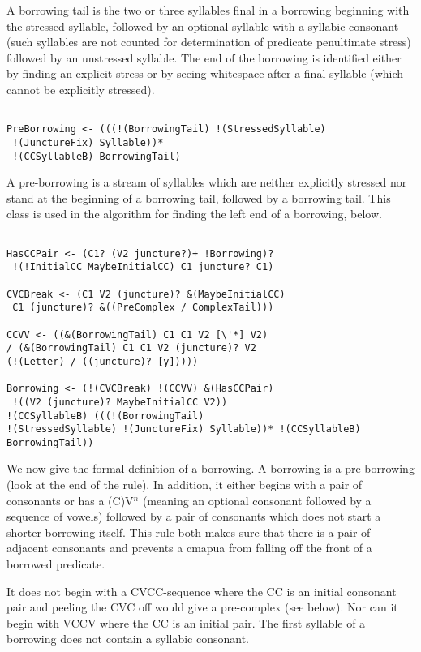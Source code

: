 \documentclass[12pt]{article}
\begin{document}
A borrowing tail is the two or three syllables final in a borrowing beginning with the stressed syllable, followed by
an optional syllable with a syllabic consonant (such syllables are not counted for determination of predicate penultimate stress) followed by an unstressed syllable.  The end of the borrowing is identified either by finding an explicit stress
or by seeing whitespace after a final syllable (which cannot be explicitly stressed).

\begin{verbatim}

PreBorrowing <- (((!(BorrowingTail) !(StressedSyllable)
 !(JunctureFix) Syllable))*
 !(CCSyllableB) BorrowingTail)

\end{verbatim}

A pre-borrowing is a stream of syllables which are neither explicitly stressed nor stand at the beginning of a borrowing tail,
followed by a borrowing tail.  This class is used in the algorithm for finding the left end of a borrowing, below.

\begin{verbatim}

HasCCPair <- (C1? (V2 juncture?)+ !Borrowing)?
 !(!InitialCC MaybeInitialCC) C1 juncture? C1)

CVCBreak <- (C1 V2 (juncture)? &(MaybeInitialCC)
 C1 (juncture)? &((PreComplex / ComplexTail)))

CCVV <- ((&(BorrowingTail) C1 C1 V2 [\'*] V2) 
/ (&(BorrowingTail) C1 C1 V2 (juncture)? V2 
(!(Letter) / ((juncture)? [y]))))

Borrowing <- (!(CVCBreak) !(CCVV) &(HasCCPair)
 !((V2 (juncture)? MaybeInitialCC V2)) 
!(CCSyllableB) (((!(BorrowingTail) 
!(StressedSyllable) !(JunctureFix) Syllable))* !(CCSyllableB) BorrowingTail))

\end{verbatim}

We now give the formal definition of a borrowing.  A borrowing is a pre-borrowing (look at the end of the rule).
In addition, it either begins with a pair of consonants or has a (C)V$^n$ (meaning an optional consonant
followed by a sequence of vowels) followed by a pair of consonants which does not start a shorter borrowing itself.
This rule both makes sure that there is a pair of adjacent consonants and prevents a cmapua from falling off the front of a borrowed predicate.

It does not begin with a CVCC-sequence where the CC is an initial consonant pair and peeling the CVC off would give
a pre-complex (see below).  Nor can it begin with VCCV where the CC is an initial pair.  The first syllable of
a borrowing does not contain a syllabic consonant.
\end{document}
